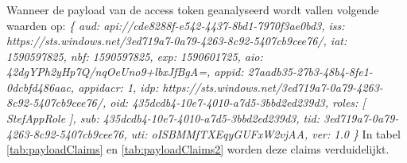 \subsubsection{}
Wanneer de payload van de access token geanalyseerd wordt vallen volgende waarden op:
\emph{
	\{\newline
		aud: api://cde8288f-e542-4437-8bd1-7970f3ae0bd3,\newline
		iss: https://sts.windows.net/3ed719a7-0a79-4263-8c92-5407cb9cee76/,\newline
		iat: 1590597825,\newline
		nbf: 1590597825,\newline
		exp: 1590601725,\newline
		aio: 42dgYPh2yHp7Q/nqOeUno9+lbxJfBgA=,\newline
		appid: 27aadb35-27b3-48b4-8fe1-0dcbfd486aac,\newline
		appidacr: 1,\newline
		idp: https://sts.windows.net/3ed719a7-0a79-4263-8c92-5407cb9cee76/,\newline
		oid: 435dcdb4-10e7-4010-a7d5-3bbd2ed239d3,\newline
		roles: [\newline
		StefAppRole\newline
		],\newline
		sub: 435dcdb4-10e7-4010-a7d5-3bbd2ed239d3,\newline
		tid: 3ed719a7-0a79-4263-8c92-5407cb9cee76,\newline
		uti: oISBMMfTXEqyGUFxW2vjAA,\newline
		ver: 1.0\newline
	\}\newline
}
In tabel \ref{tab:payloadClaims} en \ref{tab:payloadClaims2} worden deze claims verduidelijkt.\newpage
